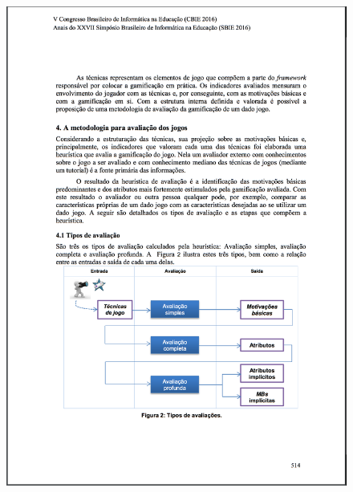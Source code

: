 \begin{apendicesenv}
\begin{figure}[h]
	\centering
		\includegraphics[keepaspectratio=true,scale=0.6]{figuras/a5.png}
\end{figure}


\end{apendicesenv}
